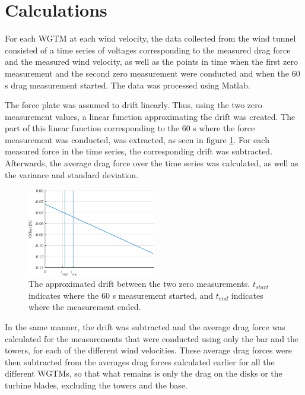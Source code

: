 \section{Calculations}

For each \gls{WGTM} at each wind velocity, the data collected from the wind tunnel consisted of a time series of voltages corresponding to the measured drag force and the measured wind velocity, as well as the points in time when the first zero measurement and the second zero measurement were conducted and when the 60 \si{\s} drag measurement started. The data was processed using Matlab. 

The force plate was assumed to drift linearly. Thus, using the two zero measurement values, a linear function approximating the drift was created. The part of this linear function corresponding to the 60 \si{\s} where the force measurement was conducted, was extracted, as seen in figure \ref{Fig:driftAdjust}. For each measured force in the time series, the corresponding drift was subtracted. Afterwards, the average drag force over the time series was calculated, as well as the variance and standard deviation. 

\begin{figure}
    \centering
    \includegraphics[width=0.5\textwidth]{0_Images/DriftDown.eps}    
    \caption{The approximated drift between the two zero measurements. $t_{start}$ indicates where the 60 \si{s} measurement started, and $t_{end}$ indicates where the measurement ended.}
    \label{Fig:driftAdjust}
\end{figure}

In the same manner, the drift was subtracted and the average drag force was calculated for the measurements that were conducted using only the bar and the towers, for each of the different wind velocities. These average drag forces were then subtracted from the averages drag forces calculated earlier for all the different \gls{WGTM}s, so that what remains is only the drag on the disks or the turbine blades, excluding the towers and the base. 

